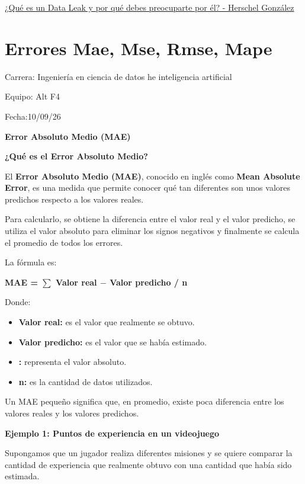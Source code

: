 \documentclass[]{article}
\begin{document}
\href{https://herschelgonzalez.com/que-es-un-data-leak-y-por-que-debes-preocuparte-por-el/\#google_vignette}{¿Qué
es un Data Leak y por qué debes preocuparte por él? - Herschel González}

\section{Errores Mae, Mse, Rmse, Mape}\label{errores-mae-mse-rmse-mape}

Carrera: Ingeniería en ciencia de datos he inteligencia artificial

Equipo: Alt F4

Fecha:10/09/26

\textbf{Error Absoluto Medio (MAE)}

\textbf{¿Qué es el Error Absoluto Medio?}

El \textbf{Error Absoluto Medio (MAE)}, conocido en inglés como
\textbf{Mean Absolute Error}, es una medida que permite conocer qué tan
diferentes son unos valores predichos respecto a los valores reales.

Para calcularlo, se obtiene la diferencia entre el valor real y el valor
predicho, se utiliza el valor absoluto para eliminar los signos
negativos y finalmente se calcula el promedio de todos los errores.

La fórmula es:

\textbf{MAE = $\sum$ \textbar Valor real $-$ Valor predicho\textbar{} / n}

Donde:

\begin{itemize}
\item
  \textbf{Valor real:} es el valor que realmente se obtuvo.
\item
  \textbf{Valor predicho:} es el valor que se había estimado.
\item
  \textbf{\textbar{} \textbar:} representa el valor absoluto.
\item
  \textbf{n:} es la cantidad de datos utilizados.
\end{itemize}

Un MAE pequeño significa que, en promedio, existe poca diferencia entre
los valores reales y los valores predichos.

\textbf{Ejemplo 1: Puntos de experiencia en un videojuego}

Supongamos que un jugador realiza diferentes misiones y se quiere
comparar la cantidad de experiencia que realmente obtuvo con una
cantidad que había sido estimada.
\end{document}
